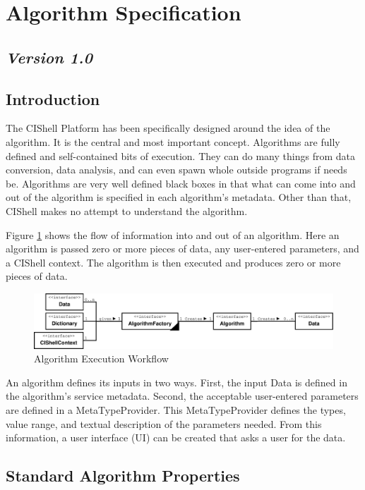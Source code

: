 \section{Algorithm Specification}

\subsection*{\textit{Version 1.0}}

\subsection{Introduction}

The CIShell Platform has been specifically designed around the idea of the
algorithm. It is the central and most important concept. Algorithms are fully
defined and self-contained bits of execution. They can do many things from data
conversion, data analysis, and can even spawn whole outside programs if needs be.
Algorithms are very well defined black boxes in that what can come into and out
of the algorithm is specified in each algorithm's metadata. Other than that,
CIShell makes no attempt to understand the algorithm.

Figure \ref{fig:algExecWorkflow} shows the flow of information into and out of an
algorithm. Here an algorithm is passed zero or more pieces of data, any
user-entered parameters, and a CIShell context. The algorithm is then executed
and produces zero or more pieces of data.

\begin{figure}[htb!]
\centering
\includegraphics[width=150mm]{../img/algExecWorkflow.pdf}
\caption{Algorithm Execution Workflow}
\label{fig:algExecWorkflow}
\end{figure}

An algorithm defines its inputs in two ways. First, the input Data is defined
in the algorithm's service metadata. Second, the acceptable user-entered
parameters are defined in a MetaTypeProvider. This MetaTypeProvider defines the
types, value range, and textual description of the parameters needed. From this
information, a user interface (UI) can be created that asks a user for the
data.

\subsection{Standard Algorithm Properties}
\orgcishellframeworkalgorithm{}
